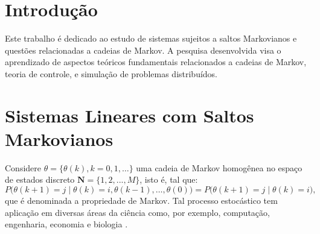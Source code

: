 \documentclass[a0,portrait]{a0poster}
\begin{document}
\begin{multicols}{2} %



\vspace{1cm}

\section{Introdu\c{c}\~ao}

Este trabalho \'e dedicado ao estudo de sistemas sujeitos a saltos Markovianos e quest\~oes relacionadas a cadeias de Markov. A pesquisa desenvolvida visa o aprendizado de aspectos te\'oricos fundamentais relacionados a cadeias de Markov, teoria de controle, e simula\c{c}\~ao de problemas distribu\'idos.\\[-2em]

\section{Sistemas Lineares com Saltos Markovianos}

Considere $\theta = \{\theta(k), k = 0,1,\ldots\}$ uma cadeia de Markov homog\^enea no espa\c{c}o de estados discreto $\mathbf{N} = \{1,2,...,M\}$, isto \'e, tal que:
%
\begin{equation}
P \bigl( \theta(k+1) = j \mid  \theta(k) = i, \theta(k-1),
   \ldots, \theta(0)\bigr)
= P \bigl( \theta(k+1) = j \mid  \theta(k) = i\bigr),
\end{equation}
%
que \'e denominada a propriedade de Markov. Tal processo estoc\'astico tem aplica\c{c}\~ao em diversas \'areas da ci\^encia como, por exemplo, computa\c{c}\~ao, engenharia, economia e biologia \cite{bremaud}.


\end{multicols}
\end{document}
